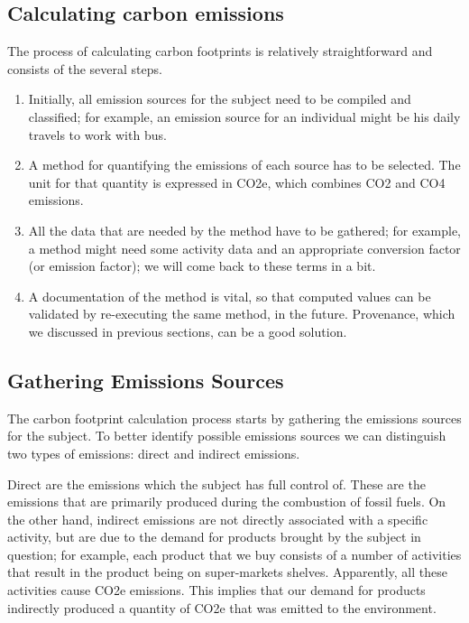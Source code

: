 \subsection{Calculating carbon emissions}

The process of calculating carbon footprints is relatively straightforward and consists of the several steps.

\begin{enumerate}
  \item
        Initially, all emission sources for the subject need to be compiled and classified; for example, an emission source for an individual might be his daily travels to work with bus.
  \item
        A method for quantifying the emissions of each source has to be selected. The unit for that quantity is expressed in CO2e, which combines CO2 and CO4 emissions.
  \item
        All the data that are needed by the method have to be gathered; for example, a method might need some activity data\cite{reference25} and an appropriate conversion factor (or emission factor); we will come back to these terms in a bit.
  \item
        A documentation of the method is vital, so that computed values can be validated by re-executing the same method, in the future. Provenance, which we discussed in previous sections, can be a good solution.
\end{enumerate}


\subsection{Gathering Emissions Sources}

The carbon footprint calculation process starts by gathering the emissions sources for the subject. To better identify possible emissions sources we can distinguish two types of emissions: direct and indirect emissions.

Direct are the emissions which the subject has full control of. These are the emissions that are primarily produced during the combustion of fossil fuels. On the other hand, indirect emissions are not directly associated with a specific activity, but are due to the demand for products brought by the subject in question; for example, each product that we buy consists of a number of activities that result in the product being on super-markets shelves. Apparently, all these activities cause CO2e emissions. This implies that our demand for products indirectly produced a quantity of CO2e that was emitted to the environment.


